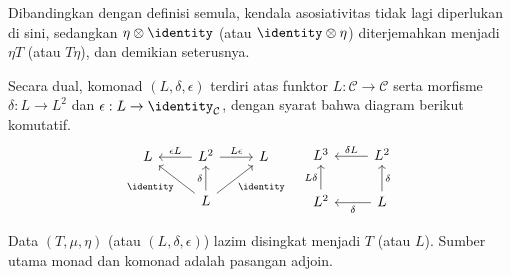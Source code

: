 Dibandingkan dengan definisi semula, kendala asosiativitas tidak lagi
diperlukan di sini, sedangkan $\eta\otimes\identity$ (atau
$\identity\otimes\eta$) diterjemahkan menjadi $\eta T$ (atau $T\eta$), dan
demikian seterusnya.

Secara dual, komonad $(L,\delta,\epsilon)$ terdiri atas funktor
$L:\mathcal{C}\to\mathcal{C}$ serta morfisme $\delta:L\to L^2$ dan
$\epsilon:L\to\identity_{\mathcal{C}}$, dengan syarat bahwa diagram berikut
komutatif.
\begin{equation*}\begin{gathered}
	\begin{tikzcd}
		L  & L^2 \arrow[l, "{\epsilon L}"'] \arrow[r, "{L\epsilon}"] & L \\
		& L \arrow[lu, "\identity"] \arrow[ru, "\identity"'] \arrow[u, "\delta"] &
	\end{tikzcd} \quad
	\begin{tikzcd}
		L^3 & L^2 \arrow[l, "\delta L"'] \\
		L^2 \arrow[u, "L\delta"] & L \arrow[u, "\delta"'] \arrow[l, "\delta"]
	\end{tikzcd}
\end{gathered}\end{equation*}

Data $(T,\mu,\eta)$ (atau $(L,\delta,\epsilon)$) lazim disingkat menjadi $T$
(atau $L$). Sumber utama monad dan komonad adalah pasangan adjoin.

